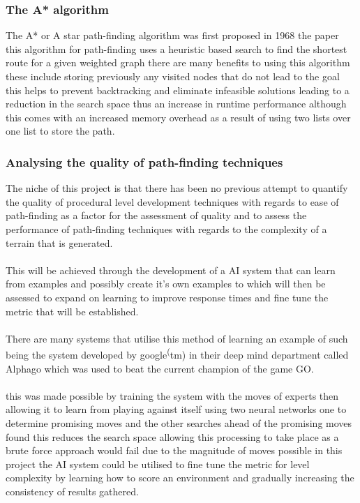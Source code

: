 \subsubsection{The A* algorithm}
The A* or A star path-finding algorithm was first proposed in 1968 the paper \cite{A*} this algorithm for path-finding uses a heuristic based search to find the shortest route for a given weighted graph there are many benefits to using this algorithm these include storing previously any visited nodes that do not lead to the goal this helps to prevent backtracking and eliminate infeasible solutions leading to a reduction in the search space thus an increase in runtime performance although this comes with an increased memory overhead as a result of using two lists over one list to store the path.   
\subsubsection{Analysing the quality of path-finding techniques}
\label{quality}
The niche of this project is that there has been no previous attempt to quantify the quality of procedural level development techniques with regards to ease of path-finding as a factor for the assessment of quality and  to assess the performance of path-finding techniques with regards to the complexity of a terrain that is generated.\\\\ This will be achieved through the development of a AI system that can learn from examples and possibly create it's own examples to which will then be assessed to expand on learning to improve response times and fine tune the metric that will be established.\\\\ There are many systems that utilise this method of learning an example of such being the system developed by google\textsuperscript(tm) in their deep mind department called Alphago which was used to beat the current champion of the game GO\cite{AI-learning}.\\\\ this was made possible by training the system with the moves of experts then allowing it to learn from playing against itself using two neural networks one to determine promising moves and the other searches ahead of the promising moves found this reduces the search space allowing this processing to take place as a brute force approach would fail due to the magnitude of moves possible in this project the AI system could be utilised to fine tune the metric for level complexity by learning how to score an environment and gradually increasing the consistency of results gathered.

